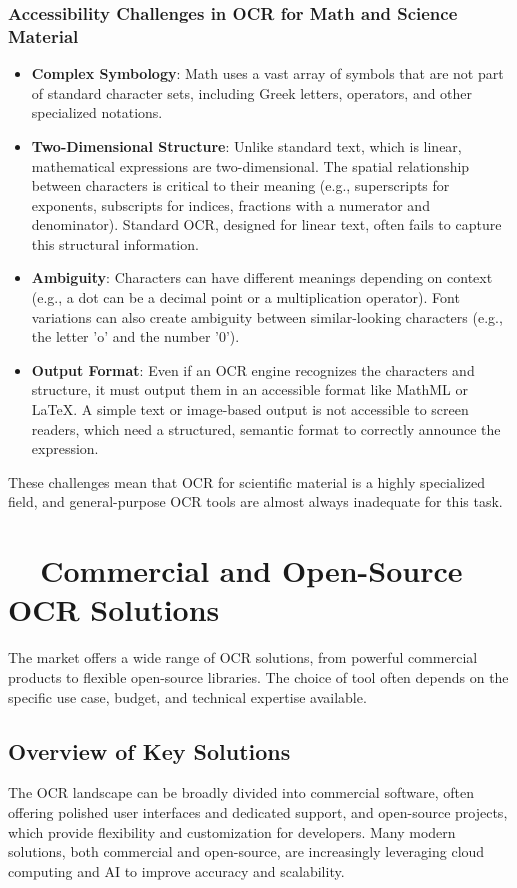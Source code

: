 \subsubsection{Accessibility Challenges in OCR for Math and Science Material}
\label{ssubsec:ocr-math-accessibility-challenges}
\begin{itemize}
	\item \textbf{Complex Symbology}: Math uses a vast array of symbols that are not part of standard character sets, including Greek letters, operators, and other specialized notations.
	\item \textbf{Two-Dimensional Structure}: Unlike standard text, which is linear, mathematical expressions are two-dimensional. The spatial relationship between characters is critical to their meaning (e.g., superscripts for exponents, subscripts for indices, fractions with a numerator and denominator). Standard OCR, designed for linear text, often fails to capture this structural information.
	\item \textbf{Ambiguity}: Characters can have different meanings depending on context (e.g., a dot can be a decimal point or a multiplication operator). Font variations can also create ambiguity between similar-looking characters (e.g., the letter 'o' and the number '0').
	\item \textbf{Output Format}: Even if an OCR engine recognizes the characters and structure, it must output them in an accessible format like MathML or LaTeX. A simple text or image-based output is not accessible to screen readers, which need a structured, semantic format to correctly announce the expression.
\end{itemize}
These challenges mean that OCR for scientific material is a highly specialized field, and general-purpose OCR tools are almost always inadequate for this task.

\section{~~Commercial and Open-Source OCR Solutions}
\label{sec:ocr-solutions}
The market offers a wide range of OCR solutions, from powerful commercial products to flexible open-source libraries. The choice of tool often depends on the specific use case, budget, and technical expertise available.

\subsection{Overview of Key Solutions}
\label{subsec:ocr-solutions-overview}
The OCR landscape can be broadly divided into commercial software, often offering polished user interfaces and dedicated support, and open-source projects, which provide flexibility and customization for developers. Many modern solutions, both commercial and open-source, are increasingly leveraging cloud computing and AI to improve accuracy and scalability.

